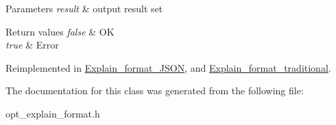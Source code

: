 \begin{DoxyParams}{Parameters}
{\em result} & output result set\\
\hline
\end{DoxyParams}

\begin{DoxyRetVals}{Return values}
{\em false} & OK \\
\hline
{\em true} & Error \\
\hline
\end{DoxyRetVals}


Reimplemented in \mbox{\hyperlink{classExplain__format__JSON_a66a631eb1439d85e5616b86bbbddc923}{Explain\+\_\+format\+\_\+\+J\+S\+ON}}, and \mbox{\hyperlink{classExplain__format__traditional_ae6c12bfd12a99873ea63fc791515eb24}{Explain\+\_\+format\+\_\+traditional}}.



The documentation for this class was generated from the following file\+:\begin{DoxyCompactItemize}
\item 
opt\+\_\+explain\+\_\+format.\+h\end{DoxyCompactItemize}
